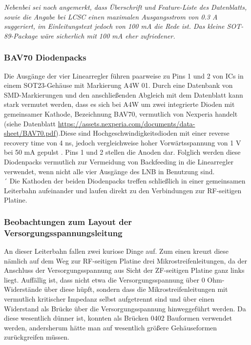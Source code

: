 \documentclass[]{article}
\begin{document}
		\noindent \textit{Nebenbei sei noch angemerkt, dass Überschrift und Feature-Liste des Datenblatts, sowie die Angabe bei LCSC einen maximalen Ausgangsstrom von 0.3 A suggeriert, im Einleitungstext jedoch von 100 mA die Rede ist. Das kleine SOT-89-Package wäre sicherlich mit 100 mA eher zufriedener.}\\
		
		
	\subsubsection{BAV70 Diodenpacks}
		
		\noindent Die Ausgänge der vier Linearregler führen paarweise zu Pins 1 und 2 von ICs in einem SOT23-Gehäuse mit Markierung A4W 01. Durch eine Datenbank von SMD-Markierungen und den anschließenden Abgleich mit dem Datenblatt kann stark vermutet werden, dass es sich bei A4W um zwei integrierte Dioden mit gemeinsamer Kathode, Bezeichnung BAV70, vermutlich von Nexperia handelt (siehe Datenblatt \url{https://assets.nexperia.com/documents/data-sheet/BAV70.pdf}).Diese sind Hochgeschwindigkeitsdioden mit einer reverse recovery time von 4 ns, jedoch vergleichweise hoher Vorwärtsspannung von 1 V bei 50 mA \glqq gepulst \grqq{}. Pins 1 und 2 stellen die Anoden dar. Folglich werden diese Diodenpacks vermutlich zur Vermeidung von Backfeeding in die Linearregler verwendet, wenn nicht alle vier Ausgänge des LNB in Benutzung sind.\\
		´
		\noindent Die Kathoden der beiden Diodenpacks treffen schließlich in einer gemeinsamen Leiterbahn aufeinander und laufen direkt zu den Verbindungen zur RF-seitigen Platine.\\
		
	\subsubsection{Beobachtungen zum Layout der Versorgungsspannungsleitung}
		
		\noindent An dieser Leiterbahn fallen zwei kuriose Dinge auf. Zum einen kreuzt diese nämlich auf dem Weg zur RF-seitigen Platine drei Mikrostreifenleitungen, da der Anschluss der Versorgungsspannung aus Sicht der ZF-seitigen Platine ganz links liegt. Auffällig ist, dass nicht etwa die Versorgungsspannung über 0 Ohm-Widerstände über diese hüpft, sondern dass die Mikrostreifenleitungen mit vermutlich kritischer Impedanz selbst aufgetrennt sind und über einen Widerstand als Brücke über die Versorgungsspannung hinweggeführt werden. Da diese wesentlich dünner ist, konnten als Brücken 0402 Bauformen verwendet werden, andersherum hätte man auf wesentlich größere Gehäuseformen zurückgreifen müssen.\\
		
\end{document}
